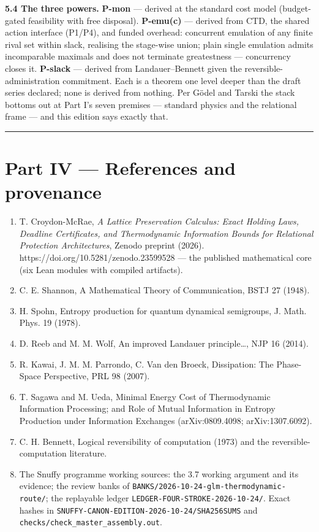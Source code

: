 \documentclass[
]{article}
\newcounter{none} %
\providecommand{\tightlist}{%
  \setlength{\itemsep}{0pt}\setlength{\parskip}{0pt}}
\begin{document}
\textbf{5.4 The three powers.} \textbf{P-mon} --- derived at the
standard cost model (budget-gated feasibility with free disposal).
\textbf{P-emu(c)} --- derived from CTD, the shared action interface
(P1/P4), and funded overhead: concurrent emulation of any finite rival
set within slack, realising the stage-wise union; plain single emulation
admits incomparable maximals and does not terminate greatestness ---
concurrency closes it. \textbf{P-slack} --- derived from
Landauer--Bennett given the reversible-administration commitment. Each
is a theorem one level deeper than the draft series declared; none is
derived from nothing. Per Gödel and Tarski the stack bottoms out at Part
I's seven premises --- standard physics and the relational frame --- and
this edition says exactly that.

\begin{center}\rule{0.5\linewidth}{0.5pt}\end{center}

\section{Part IV --- References and
provenance}\label{part-iv-references-and-provenance}

\begin{enumerate}
\def\labelenumi{\arabic{enumi}.}
\tightlist
\item
  T. Croydon-McRae, \emph{A Lattice Preservation Calculus: Exact Holding
  Laws, Deadline Certificates, and Thermodynamic Information Bounds for
  Relational Protection Architectures}, Zenodo preprint (2026).
  https://doi.org/10.5281/zenodo.23599528 --- the published mathematical
  core (six Lean modules with compiled artifacts).
\item
  C. E. Shannon, A Mathematical Theory of Communication, BSTJ 27 (1948).
\item
  H. Spohn, Entropy production for quantum dynamical semigroups, J.
  Math. Phys. 19 (1978).
\item
  D. Reeb and M. M. Wolf, An improved Landauer principle\ldots, NJP 16
  (2014).
\item
  R. Kawai, J. M. M. Parrondo, C. Van den Broeck, Dissipation: The
  Phase-Space Perspective, PRL 98 (2007).
\item
  T. Sagawa and M. Ueda, Minimal Energy Cost of Thermodynamic
  Information Processing; and Role of Mutual Information in Entropy
  Production under Information Exchanges (arXiv:0809.4098;
  arXiv:1307.6092).
\item
  C. H. Bennett, Logical reversibility of computation (1973) and the
  reversible-computation literature.
\item
  The Snuffy programme working sources: the 3.7 working argument and its
  evidence; the review banks of
  \texttt{BANKS/2026-10-24-glm-thermodynamic-route/}; the replayable
  ledger \texttt{LEDGER-FOUR-STROKE-2026-10-24/}. Exact hashes in
  \texttt{SNUFFY-CANON-EDITION-2026-10-24/SHA256SUMS} and
  \texttt{checks/check\_master\_assembly.out}.
\end{enumerate}
\end{document}
